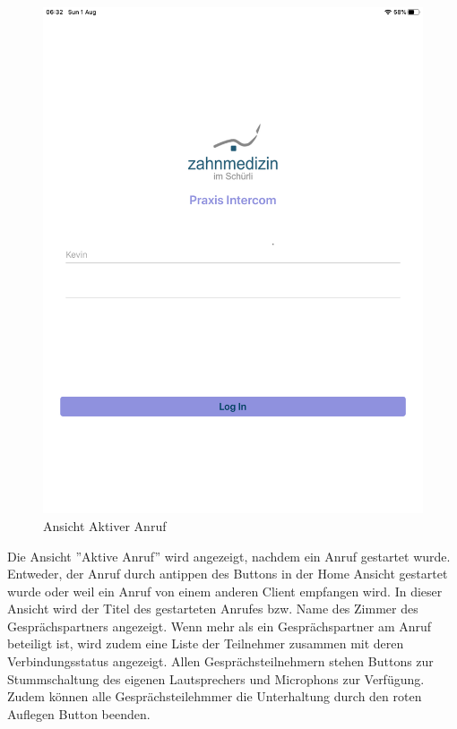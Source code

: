 \begin{figure}[h]
\begin{minipage}[b]{0.4\textwidth}
        \includegraphics[width=\textwidth]{graphics/screenshots/placeholder}
        \caption{Ansicht Aktiver Anruf}
    \end{minipage}
    \label{fig:MobileClient-Screens3}
\end{figure}

Die Ansicht ''Aktive Anruf'' wird angezeigt, nachdem ein Anruf gestartet wurde.
Entweder, der Anruf durch antippen des Buttons in der Home Ansicht gestartet wurde oder weil ein Anruf von einem anderen Client empfangen wird.
In dieser Ansicht wird der Titel des gestarteten Anrufes bzw. Name des Zimmer des Gesprächspartners angezeigt.
Wenn mehr als ein Gesprächspartner am Anruf beteiligt ist, wird zudem eine Liste der Teilnehmer zusammen mit deren Verbindungsstatus angezeigt.
Allen Gesprächsteilnehmern stehen Buttons zur Stummschaltung des eigenen Lautsprechers und Microphons zur Verfügung.
Zudem können alle Gesprächsteilehmmer die Unterhaltung durch den roten Auflegen Button beenden.

